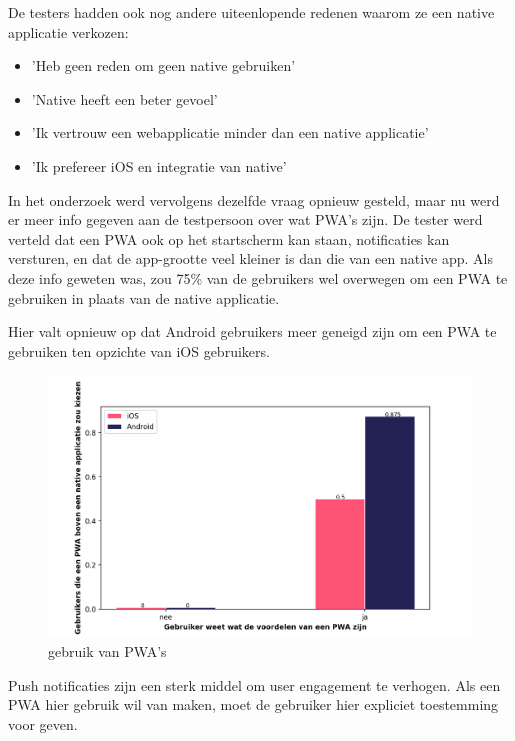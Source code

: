 		De testers hadden ook nog andere uiteenlopende redenen waarom ze een native applicatie verkozen:
		\begin{itemize}
	  		\item 'Heb geen reden om geen native gebruiken'
	  		\item 'Native heeft een beter gevoel'
	  		\item 'Ik vertrouw een webapplicatie minder dan een native applicatie'
	  		\item 'Ik prefereer iOS en integratie van native'
	  	\end{itemize}	
			  	
		In het onderzoek werd vervolgens dezelfde vraag opnieuw gesteld, maar nu werd er meer info gegeven aan de testpersoon over wat PWA's zijn. De tester werd verteld dat een PWA ook op het startscherm kan staan, notificaties kan versturen, en dat de app-grootte veel kleiner is dan die van een native app. 
		Als deze info geweten was, zou 75\% van de gebruikers wel overwegen om een PWA te gebruiken in plaats van de native applicatie.
		
		Hier valt opnieuw op dat Android gebruikers meer geneigd zijn om een PWA te gebruiken ten opzichte van iOS gebruikers.
		
		\begin{figure}[H]
			\centering
			\includegraphics[width=120mm]{./img/PWA_over_Native.png}
			\caption{gebruik van PWA's}
		\end{figure}

		
		Push notificaties zijn een sterk middel om user engagement te verhogen. \autocite{Gaunt2020} Als een PWA hier gebruik wil van maken, moet de gebruiker hier expliciet toestemming voor geven. 
		

